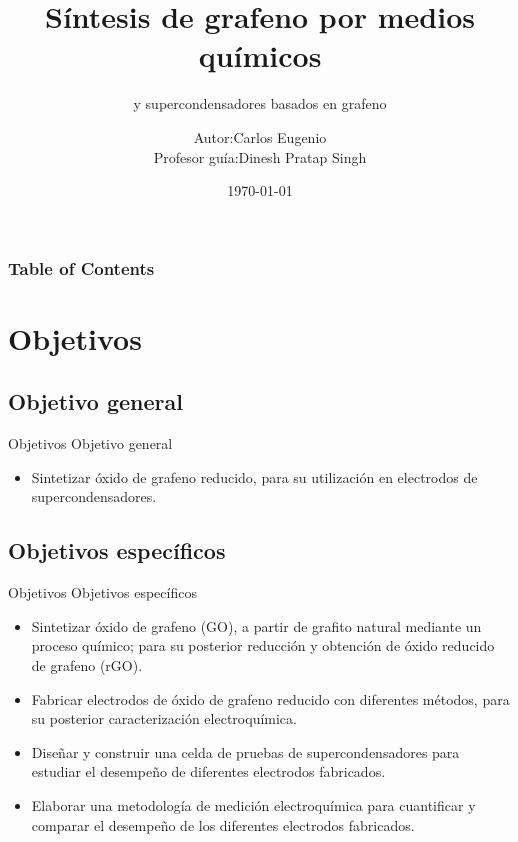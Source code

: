 \documentclass[aspectratio=169]{beamer}
\title{Síntesis de grafeno por medios químicos}
\subtitle{y supercondensadores basados en grafeno}
\date{\today}
\institute{Universidad de Santiago de Chile\\ Laboratorio de Nanosíntesis}
\begin{document}
	\author[Carlos Eugenio]{\begin{tabular}{r@{ }l} 
			Autor:      & Carlos Eugenio \\[1ex] 
			Profesor guía: & Dinesh Pratap Singh
	\end{tabular}}
	\maketitle
	\begin{frame}
		\frametitle{Table of Contents}
		\tableofcontents
	\end{frame}

	\section{Objetivos}
	\subsection{Objetivo general}
	\begin{frame}{Objetivos}
	Objetivo general
		\begin{itemize}
			\item Sintetizar óxido de grafeno reducido, para su utilización en electrodos de supercondensadores.
		\end{itemize}
	
	\end{frame}

	\subsection{Objetivos específicos}
	\begin{frame}{Objetivos}
	Objetivos específicos
		\begin{itemize}[<+>]
			\item Sintetizar óxido de grafeno (GO), a partir de grafito natural mediante un proceso químico; para su posterior reducción y obtención de óxido reducido de grafeno (rGO).
			\item Fabricar electrodos de óxido de grafeno reducido con diferentes métodos, para su posterior caracterización electroquímica.
			\item Diseñar y construir una celda de pruebas de supercondensadores para estudiar el desempeño de diferentes electrodos fabricados.
			\item Elaborar una metodología de medición electroquímica para cuantificar y comparar el desempeño de los diferentes electrodos fabricados. 
		\end{itemize}
	\end{frame}
\end{document}
